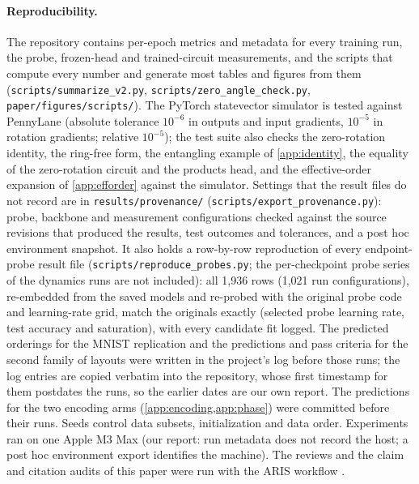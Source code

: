 \paragraph{Reproducibility.}
The repository contains per-epoch metrics and metadata for every training run, the probe, frozen-head and
trained-circuit measurements, and the scripts that compute every number and generate most tables and figures
from them (\texttt{scripts/summarize\_v2.py}, \texttt{scripts/zero\_angle\_check.py},
\texttt{paper/figures/scripts/}). The PyTorch statevector simulator is tested against
PennyLane (absolute tolerance $10^{-6}$ in outputs and input gradients, $10^{-5}$ in rotation
gradients; relative $10^{-5}$); the test suite also checks the zero-rotation identity, the ring-free form, the
entangling example of \cref{app:identity}, the equality of the zero-rotation circuit and the
products head, and the effective-order expansion of \cref{app:efforder} against the simulator. Settings that the result files do not record are in \texttt{results/provenance/} (\texttt{scripts/export\_provenance.py}): probe, backbone and measurement configurations checked against the source revisions that produced the results, test outcomes and tolerances, and a post hoc environment snapshot. It also holds a row-by-row reproduction of every endpoint-probe result file (\texttt{scripts/reproduce\_probes.py}; the per-checkpoint probe series of the dynamics runs are not included): all 1,936 rows (1,021 run configurations), re-embedded from the saved models and re-probed with the original probe code and learning-rate grid, match the originals exactly (selected probe learning rate, test accuracy and saturation), with every candidate fit logged.
The predicted orderings for the MNIST replication and the predictions and pass criteria for the
second family of layouts were written in the project's log before those runs; the log entries are
copied verbatim into the repository, whose first timestamp for them postdates the runs, so the earlier dates are our own report. The
predictions for the two encoding arms (\cref{app:encoding,app:phase}) were committed before their runs. Seeds control
data subsets, initialization and data order. Experiments ran on one Apple M3 Max (our report: run metadata does not record the host; a post hoc environment export identifies the machine). The reviews
and the claim and citation audits of this paper were run with the ARIS workflow
\citep{yang2026aris}.
